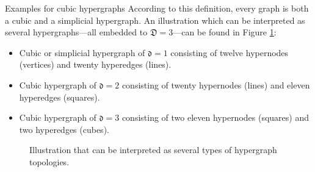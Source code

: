 \documentclass[a4paper, english, 12pt, reqno, draft]{amsart}
\makeatletter
\theoremstyle{definition}
\theoremstyle{remark}
\numberwithin{equation}{section}
\newcommand{\locDim}{\ensuremath{\mathfrak d}}
\newcommand{\globDim}{\ensuremath{\mathfrak D}}
\def\paragraph{\@startsection{paragraph}{4}%
  \z@\z@{-\fontdimen2\font}%
  {\normalfont\scshape}}
\makeatother
\begin{document}
\paragraph{Examples for cubic hypergraphs}
% 
According to this definition, every graph is both a cubic and a simplicial hypergraph. An illustration which can be interpreted as several hypergraphs---all embedded to $\globDim = 3$---can be found in Figure \ref{FIG:hyG_topo}:
% 
\begin{itemize}
 \item Cubic or simplicial hypergraph of $\locDim = 1$ consisting of twelve hypernodes (vertices) and  twenty hyperedges (lines).
 \item Cubic hypergraph of $\locDim = 2$ consisting of twenty hypernodes (lines) and eleven hyperedges (squares).
 \item Cubic hypergraph of $\locDim = 3$ consisting of two eleven hypernodes (squares) and two hyperedges (cubes).
\end{itemize}
% 
\begin{figure}[ht]
 \caption{Illustration that can be interpreted as several types of hypergraph topologies.}\label{FIG:hyG_topo}
\end{figure}
% 
\end{document}
